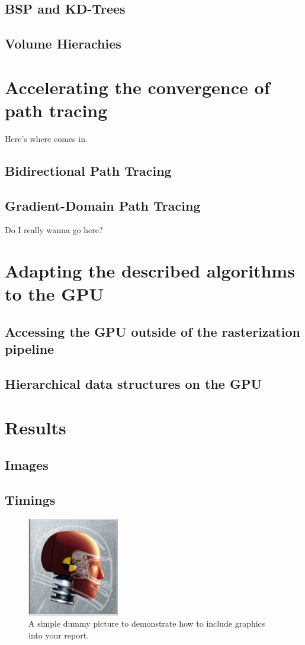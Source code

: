\documentclass{ACGSeminar}
\begin{document}
\subsection{BSP and KD-Trees}
\subsection{Volume Hierachies}

\section{Accelerating the convergence of path tracing}
Here's where \cite{Pharr:2010:PBR:1854996} comes in.
\subsection{Bidirectional Path Tracing}
\subsection{Gradient-Domain Path Tracing}
Do I really wanna go here? \cite{Kettunen2015sg}

\section{Adapting the described algorithms to the GPU}
\subsection{Accessing the GPU outside of the rasterization pipeline}
\subsection{Hierarchical data structures on the GPU}

\section{Results}
\subsection{Images}
\subsection{Timings}

\begin{figure}[htb!]
  \begin{centering}
    \includegraphics[width=4cm]{figures/dummy.jpg}\par
  \end{centering}
  \caption{A simple dummy picture to demonstrate how
           to include graphics into your report.}
  \label{fig:dummy}
\end{figure}


\printbibliography
\cleardoublepage
\end{document}
